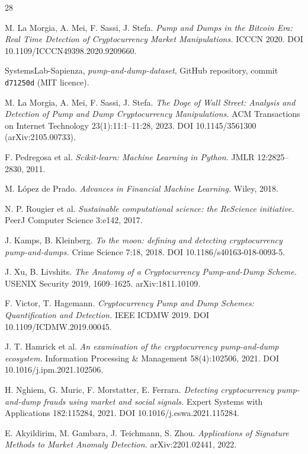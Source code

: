 \documentclass[runningheads]{llncs}
\begin{document}
\begin{thebibliography}{28}

M. La Morgia, A. Mei, F. Sassi, J. Stefa. \emph{Pump and Dumps in the
Bitcoin Era: Real Time Detection of Cryptocurrency Market
Manipulations.} ICCCN 2020. DOI 10.1109/ICCCN49398.2020.9209660.

SystemsLab-Sapienza, \emph{pump-and-dump-dataset}, GitHub repository,
commit \texttt{d71250d} (MIT licence).

M. La Morgia, A. Mei, F. Sassi, J. Stefa. \emph{The Doge of Wall
Street: Analysis and Detection of Pump and Dump Cryptocurrency
Manipulations.} ACM Transactions on Internet Technology
23(1):11:1--11:28, 2023. DOI 10.1145/3561300 (arXiv:2105.00733).

F. Pedregosa et al. \emph{Scikit-learn: Machine Learning in Python.}
JMLR 12:2825--2830, 2011.

M. L\'opez de Prado. \emph{Advances in Financial Machine Learning.}
Wiley, 2018.

N. P. Rougier et al. \emph{Sustainable computational science: the
ReScience initiative.} PeerJ Computer Science 3:e142, 2017.

J. Kamps, B. Kleinberg. \emph{To the moon: defining and detecting
cryptocurrency pump-and-dumps.} Crime Science 7:18, 2018. DOI
10.1186/s40163-018-0093-5.

J. Xu, B. Livshits. \emph{The Anatomy of a Cryptocurrency
Pump-and-Dump Scheme.} USENIX Security 2019, 1609--1625.
arXiv:1811.10109.

F. Victor, T. Hagemann. \emph{Cryptocurrency Pump and Dump Schemes:
Quantification and Detection.} IEEE ICDMW 2019. DOI
10.1109/ICDMW.2019.00045.

J. T. Hamrick et al. \emph{An examination of the cryptocurrency
pump-and-dump ecosystem.} Information Processing \& Management
58(4):102506, 2021. DOI 10.1016/j.ipm.2021.102506.

H. Nghiem, G. Muric, F. Morstatter, E. Ferrara. \emph{Detecting
cryptocurrency pump-and-dump frauds using market and social signals.}
Expert Systems with Applications 182:115284, 2021. DOI
10.1016/j.eswa.2021.115284.

E. Akyildirim, M. Gambara, J. Teichmann, S. Zhou. \emph{Applications of
Signature Methods to Market Anomaly Detection.} arXiv:2201.02441,
2022.


\end{thebibliography}
\end{document}
